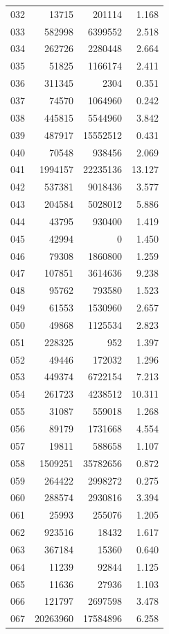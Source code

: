\documentclass[anonymous,notoc]{gmcm2026}
\begin{document}
\begin{longtable}{lrrr}
032 & 13715 & 201114 & 1.168 \\
033 & 582998 & 6399552 & 2.518 \\
034 & 262726 & 2280448 & 2.664 \\
035 & 51825 & 1166174 & 2.411 \\
036 & 311345 & 2304 & 0.351 \\
037 & 74570 & 1064960 & 0.242 \\
038 & 445815 & 5544960 & 3.842 \\
039 & 487917 & 15552512 & 0.431 \\
040 & 70548 & 938456 & 2.069 \\
041 & 1994157 & 22235136 & 13.127 \\
042 & 537381 & 9018436 & 3.577 \\
043 & 204584 & 5028012 & 5.886 \\
044 & 43795 & 930400 & 1.419 \\
045 & 42994 & 0 & 1.450 \\
046 & 79308 & 1860800 & 1.259 \\
047 & 107851 & 3614636 & 9.238 \\
048 & 95762 & 793580 & 1.523 \\
049 & 61553 & 1530960 & 2.657 \\
050 & 49868 & 1125534 & 2.823 \\
051 & 228325 & 952 & 1.397 \\
052 & 49446 & 172032 & 1.296 \\
053 & 449374 & 6722154 & 7.213 \\
054 & 261723 & 4238512 & 10.311 \\
055 & 31087 & 559018 & 1.268 \\
056 & 89179 & 1731668 & 4.554 \\
057 & 19811 & 588658 & 1.107 \\
058 & 1509251 & 35782656 & 0.872 \\
059 & 264422 & 2998272 & 0.275 \\
060 & 288574 & 2930816 & 3.394 \\
061 & 25993 & 255076 & 1.205 \\
062 & 923516 & 18432 & 1.617 \\
063 & 367184 & 15360 & 0.640 \\
064 & 11239 & 92844 & 1.125 \\
065 & 11636 & 27936 & 1.103 \\
066 & 121797 & 2697598 & 3.478 \\
067 & 20263960 & 17584896 & 6.258 \\

\end{longtable}
\end{document}
